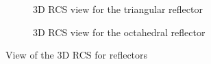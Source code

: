 \documentclass[12pt,DIV14,BCOR12mm,a4paper,footinclude=false,headinclude,parskip=half-,twoside,openright,cleardoublepage=empty,toc=index,bibliography=totoc,listof=totoc]{scrreprt}
\numberwithin{equation}{chapter}
\begin{document}
\begin{figure}[t]
    \centering
    \begin{subfigure}{0.45\textwidth}
        \centering
        \caption{3D RCS view for the triangular reflector}
        \label{3d rcs view for the triangular corner reflector}
    \end{subfigure}
    \begin{subfigure}{0.45\textwidth}
        \centering
        \caption{3D RCS view for the octahedral reflector}
        \label{3d rcs view for the octahedral reflector}
    \end{subfigure}
    \caption{View of the 3D RCS for reflectors}
    \label{view of the rcs for reflectors}
\end{figure}
\end{document}
